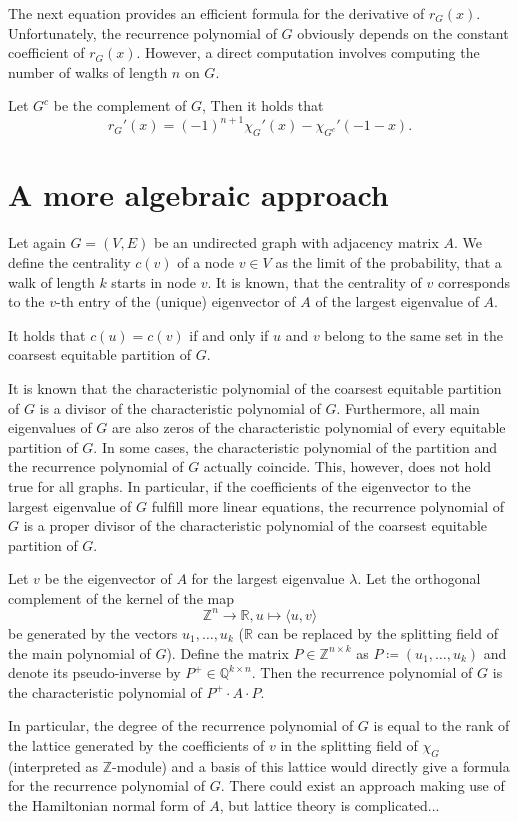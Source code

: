 \documentclass[a4paper,12pt]{article}
\begin{document}
The next equation provides an efficient formula for the derivative of $r_G(x)$. Unfortunately, the recurrence polynomial of $G$ obviously depends on the constant coefficient of $r_G(x)$. However, a direct computation involves computing the number of walks of length $n$ on $G$.

\begin{lemma}
Let $G^c$ be the complement of $G$, Then it holds that
$$
r_G'(x) = (-1)^{n+1}\chi_G'(x) - \chi_{G^c}'(-1-x).
$$
\end{lemma}

\section{A more algebraic approach}

Let again $G=(V,E)$ be an undirected graph with adjacency matrix $A$. We define the centrality $c(v)$ of a node $v\in V$ as the limit of the probability, that a walk of length $k$ starts in node $v$. It is known, that the centrality of $v$ corresponds to the $v$-th entry of the (unique) eigenvector of $A$ of the largest eigenvalue of $A$.

\begin{lemma}
It holds that $c(u) = c(v)$ if and only if $u$ and $v$ belong to the same set in the coarsest equitable partition of $G$.
\end{lemma}

It is known that the characteristic polynomial of the coarsest equitable partition of $G$ is a divisor of the characteristic polynomial of $G$. Furthermore, all main eigenvalues of $G$ are also zeros of the characteristic polynomial of every equitable partition of $G$. In some cases, the characteristic polynomial of the partition and the recurrence polynomial of $G$ actually coincide. This, however, does not hold true for all graphs. In particular, if the coefficients of the eigenvector to the largest eigenvalue of $G$ fulfill more linear equations, the recurrence polynomial of $G$ is a proper divisor of the characteristic polynomial of the coarsest equitable partition of $G$.

\begin{lemma}
Let $v$ be the eigenvector of $A$ for the largest eigenvalue $\lambda$. Let the orthogonal complement of the kernel of the map 
$$
\mathbb{Z}^n \to \mathbb{R}, u \mapsto \langle u, v \rangle
$$
be generated by the vectors $u_1, \ldots, u_k$ ($\mathbb{R}$ can be replaced by the splitting field of the main polynomial of $G$).
Define the matrix $P\in\mathbb{Z}^{n \times k}$ as $P \coloneqq (u_1, \ldots, u_k)$ and denote its pseudo-inverse by $P^+ \in \mathbb{Q}^{k\times n}$. Then the recurrence polynomial of $G$ is the characteristic polynomial of $P^+ \cdot A \cdot P$.
\end{lemma}

In particular, the degree of the recurrence polynomial of $G$ is equal to the rank of the lattice generated by the coefficients of $v$ in the splitting field of $\chi_G$ (interpreted as $\mathbb{Z}$-module) and a basis of this lattice would directly give a formula for the recurrence polynomial of $G$. There could exist an approach making use of the Hamiltonian normal form of $A$, but lattice theory is complicated...
\end{document}
